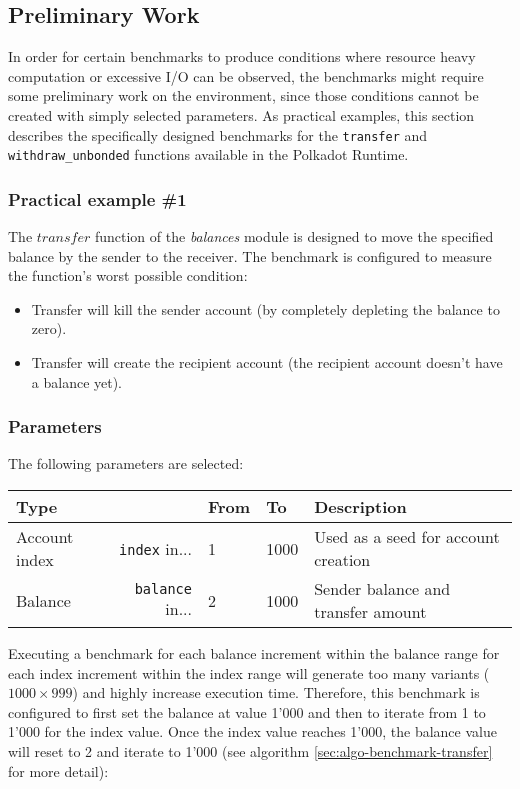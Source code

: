 \documentclass[11pt,a4paper]{article}
\begin{document}
\subsection{Preliminary Work}\label{sect:examples-preliminary-work}
In order for certain benchmarks to produce conditions where resource heavy computation or excessive
I/O can be observed, the benchmarks might require some preliminary work on the environment, since those
conditions cannot be created with simply selected parameters.
As practical examples, this section describes the specifically designed benchmarks for the \verb|transfer|
and \verb|withdraw_unbonded| functions available in the Polkadot Runtime.

\subsubsection{Practical example \#1}
The $transfer$ function of the \textit{balances} module is designed to move the specified balance by the sender to the receiver.
The benchmark is configured to measure the function's worst possible condition:

\begin{itemize}
  \item Transfer will kill the sender account (by completely depleting the balance to zero).
  \item Transfer will create the recipient account (the recipient account doesn't have a balance yet).
\end{itemize}

\subsubsection*{Parameters}
The following parameters are selected:

\begin{center}
  \begin{tabular}{ l|r l l l }
    \textbf{Type} && \textbf{From} & \textbf{To} & \textbf{Description}\\
    \hline
    Account index & \verb|index| in... & 1 & 1000 & Used as a seed for account creation \\
    Balance & \verb|balance| in... & 2 & 1000 & Sender balance and transfer amount \\
  \end{tabular}
\end{center}

Executing a benchmark for each balance increment within the balance range for each index increment
within the index range will generate too many variants ($1000 \times 999$) and highly increase
execution time. Therefore, this benchmark is configured to first set the balance at value 1'000
and then to iterate from 1 to 1'000 for the index value. Once the index value reaches 1'000, the
balance value will reset to 2 and iterate to 1'000 (see algorithm \ref{sec:algo-benchmark-transfer}
for more detail):
\end{document}
